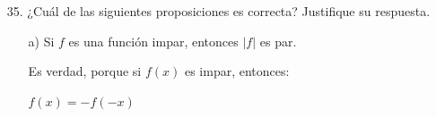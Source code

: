 \documentclass{article}
\begin{document}
\begin{enumerate}
\begin{enumerate}
\begin{enumerate}
                \item[2.] P.D. \( f \) no es impar
                
                \(\Rightarrow \neg(\forall a \in \text{Dom}, f(a) = -f(-a))\)
                
                \(\Rightarrow \exists a \in \text{Dom}\) tal que \(f(a) \neq -f(-a)\)
                
                \begin{proof}Sea \(a = 1\), calculamos:
                
                \(f(a) = f(1)\)
                
                \(f(a) = (1)^2 - 3(1) + 4\)
                
                \(f(a) = 1 - 3 + 4\)
                
                \(f(a) = 2\)
                \vspace{\baselineskip}
                
                También:
                
                \(-f(-a) = -f(-1)\)
                
                \(-f(-a) = -[(-1)^2 - 3(-1) + 4]\)
                
                \(-f(-a) = -(1 + 3 + 4)\)
                
                \(-f(-a) = -8\)
                \vspace{\baselineskip}
                
                Así, para alguna \(a\):
                
                \(f(a) \neq -f(-a)\)
                \end{proof}
            \end{enumerate}
    \end{enumerate}
    \vspace{\baselineskip}
    
\item[35.] ¿Cuál de las siguientes proposiciones es correcta? Justifique su respuesta.
    \begin{enumerate}
        \item[a)] Si \( f \) es una función impar, entonces \( |f| \) es par.
        
        Es verdad, porque si \( f(x) \) es impar, entonces:
        
        \(f(x) = -f(-x) \)
        \vspace{\baselineskip}
        

\end{enumerate}
\end{enumerate}
\end{document}
